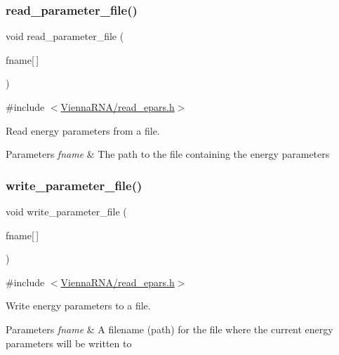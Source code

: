 \subsubsection{\texorpdfstring{read\+\_\+parameter\+\_\+file()}{read\_parameter\_file()}}
{\footnotesize\ttfamily void read\+\_\+parameter\+\_\+file (\begin{DoxyParamCaption}\item[{const char}]{fname\mbox{[}$\,$\mbox{]} }\end{DoxyParamCaption})}



{\ttfamily \#include $<$\mbox{\hyperlink{read__epars_8h}{Vienna\+R\+N\+A/read\+\_\+epars.\+h}}$>$}



Read energy parameters from a file. 


\begin{DoxyParams}{Parameters}
{\em fname} & The path to the file containing the energy parameters \\
\hline
\end{DoxyParams}
\mbox{\label{group__energy__parameters__rw_ga8a43459be386a7489feeab68dc2c6c76}} 
\subsubsection{\texorpdfstring{write\+\_\+parameter\+\_\+file()}{write\_parameter\_file()}}
{\footnotesize\ttfamily void write\+\_\+parameter\+\_\+file (\begin{DoxyParamCaption}\item[{const char}]{fname\mbox{[}$\,$\mbox{]} }\end{DoxyParamCaption})}



{\ttfamily \#include $<$\mbox{\hyperlink{read__epars_8h}{Vienna\+R\+N\+A/read\+\_\+epars.\+h}}$>$}



Write energy parameters to a file. 


\begin{DoxyParams}{Parameters}
{\em fname} & A filename (path) for the file where the current energy parameters will be written to \\
\hline
\end{DoxyParams}
\mbox{\label{group__energy__parameters__rw_gaaab17a97b765b302b16f7b9eb4004801}} 
